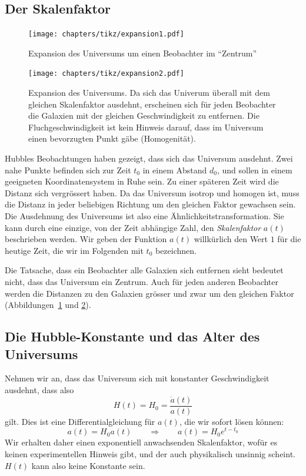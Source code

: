 \subsection{Der Skalenfaktor}
\begin{figure}
\centering
\texttt{[image: chapters/tikz/expansion1.pdf]}
\caption{Expansion des Universums um einen Beobachter im ``Zentrum''
\label{skript:figure:expansion1}}
\end{figure}
\begin{figure}
\centering
\texttt{[image: chapters/tikz/expansion2.pdf]}
\caption{Expansion des Universums. Da sich das Univerum überall
mit dem gleichen Skalenfaktor ausdehnt, erscheinen sich für jeden
Beobachter die Galaxien mit der gleichen Geschwindigkeit zu entfernen.
Die Fluchgeschwindigkeit ist kein Hinweis darauf, dass im Universum
einen bevorzugten Punkt gäbe (Homogenität).
\label{skript:figure:expansion2}}
\end{figure}
Hubbles Beobachtungen haben gezeigt, dass sich das Universum ausdehnt.
Zwei nahe Punkte befinden sich zur Zeit $t_0$ in einem Abstand $d_0$,
und sollen in einem geeigneten Koordinatensystem in Ruhe sein.
Zu einer späteren Zeit wird die Distanz sich vergrössert haben.
Da das Universum isotrop und homogen ist, muss die Distanz in jeder
beliebigen Richtung um den gleichen Faktor gewachsen sein.
Die Ausdehnung des Universums ist also eine Ähnlichkeitstransformation.
Sie kann durch eine einzige, von der Zeit abhängige Zahl,
den {\em Skalenfaktor} $a(t)$ beschrieben werden.
Wir geben der Funktion $a(t)$ willkürlich den Wert $1$ für die heutige
Zeit, die wir im Folgenden mit $t_0$ bezeichnen.

Die Tatsache, dass ein Beobachter alle Galaxien sich entfernen
sieht bedeutet nicht, dass das Universum ein Zentrum.
Auch für jeden anderen Beobachter werden die Distanzen zu den
Galaxien grösser und zwar um den gleichen Faktor
(Abbildungen~\ref{skript:figure:expansion1} und
\ref{skript:figure:expansion2}).

\subsection{Die Hubble-Konstante und das Alter des Universums}
Nehmen wir an, dass das Universum sich mit konstanter Geschwindigkeit
ausdehnt, dass also 
\[
H(t)=H_0=\frac{\dot a(t)}{a(t)}
\]
gilt.
Dies ist eine Differentialgleichung für $a(t)$, die wir sofort
lösen können:
\[
a(t) = H_0a(t)
\qquad \Rightarrow\qquad
a(t)=H_0 e^{t-t_0}
\]
Wir erhalten daher einen exponentiell anwachsenden Skalenfaktor,
wofür es keinen experimentellen Hinweis gibt, und der auch physikalisch
unsinnig scheint.
$H(t)$ kann also keine Konstante sein.

